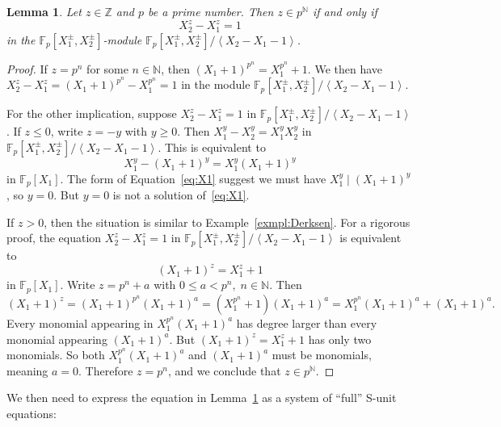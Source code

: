 \documentclass[letterpaper, 11pt, thm-restate]{article}
\numberwithin{equation}{section}
\newcommand{\Z}{\mathbb{Z}}
\newcommand{\N}{\mathbb{N}}
\newcommand{\F}{\mathbb{F}}
\newcommand{\gen}[1]{\left\langle {#1} \right\rangle}
\newtheorem{lem}[thrm]{Lemma}
\theoremstyle{definition}
\theoremstyle{definition}
\theoremstyle{definition}
\begin{document}
\begin{lem}\label{lem:pn}
    Let $z \in \Z$ and $p$ be a prime number. Then $z \in p^{\N}$ if and only if
    \[
    X_2^z - X_1^z = 1
    \]
    in the $\F_p[X_1^{\pm}, X_2^{\pm}]$-module $\F_p[X_1^{\pm}, X_2^{\pm}]/\gen{X_2 - X_1 - 1}$.
\end{lem}
\begin{proof}
    If $z = p^n$ for some $n \in \N$, then $(X_1+1)^{p^n} = X_1^{p^n} + 1$.
    We then have $X_2^z - X_1^z = (X_1+1)^{p^n} - X_1^{p^n} = 1$ in the module $\F_p[X_1^{\pm}, X_2^{\pm}]/\gen{X_2 - X_1 - 1}$.

    For the other implication, suppose $X_2^z - X_1^z = 1$ in $\F_p[X_1^{\pm}, X_2^{\pm}]/\gen{X_2 - X_1 - 1}$.
    If $z \leq 0$, write $z = -y$ with $y \geq 0$.
    Then $X_1^y - X_2^y = X_1^y X_2^y$ in $\F_p[X_1^{\pm}, X_2^{\pm}]/\gen{X_2 - X_1 - 1}$.
    This is equivalent to 
    \begin{equation}\label{eq:X1}
        X_1^y - (X_1+1)^y = X_1^y (X_1+1)^y
    \end{equation}
    in $\F_p[X_1]$.
    The form of Equation~\eqref{eq:X1} suggest we must have $X_1^y \mid (X_1+1)^y$, so $y = 0$. But $y = 0$ is not a solution of~\eqref{eq:X1}.

    If $z > 0$, then the situation is similar to Example~\ref{exmpl:Derksen}.
    For a rigorous proof, the equation $X_2^z - X_1^z = 1$ in $\F_p[X_1^{\pm}, X_2^{\pm}]/\gen{X_2 - X_1 - 1}$ is equivalent to 
    \[
        (X_1+1)^z = X_1^z + 1
    \]
    in $\F_p[X_1]$.
    Write $z = p^n + a$ with $0 \leq a < p^n,\; n \in \N$.
    Then
    \[
    (X_1 + 1)^{z} = (X_1 + 1)^{p^n} (X_1 + 1)^a = (X_1^{p^n} + 1) (X_1 + 1)^a = X_1^{p^n} (X_1 + 1)^a + (X_1 + 1)^a.
    \]
    Every monomial appearing in $X_1^{p^n} (X_1 + 1)^a$ has degree larger than every monomial appearing $(X_1 + 1)^a$. But $(X_1 + 1)^{z} = X_1^{z} + 1$ has only two monomials.
    So both $X_1^{p^n} (X_1 + 1)^a$ and $(X_1 + 1)^a$ must be monomials, meaning $a = 0$.
    Therefore $z = p^n$, and we conclude that $z \in p^{\N}$.   
\end{proof}

We then need to express the equation in Lemma~\ref{lem:pn} as a system of ``full'' S-unit equations:
\end{document}
